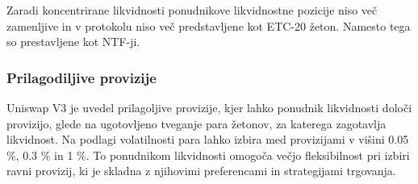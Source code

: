 \documentclass[a4paper,12pt]{article}%
\begin{document}





Zaradi koncentrirane likvidnosti ponudnikove likvidnostne pozicije niso več zamenljive in v protokolu niso več predstavljene kot ETC-20 žeton. Namesto tega so prestavljene kot NTF-ji. 


\subsubsection{Prilagodiljive provizije}
Uniswap V3 je uvedel prilagoljive provizije, kjer lahko ponudnik likvidnosti določi provizijo, glede na ugotovljeno tveganje para žetonov, za katerega zagotavlja likvidnost. Na podlagi volatilnosti para lahko izbira med provizijami v višini 0.05 \%, 0.3 \% in 1 \%. 
To ponudnikom likvidnosti omogoča večjo fleksibilnost pri izbiri ravni provizij, ki je skladna z njihovimi preferencami in strategijami trgovanja.
\end{document}
